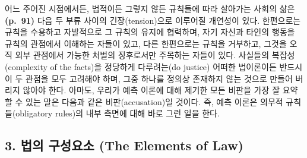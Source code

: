어느 주어진 시점에서든, 법적이든 그렇지 않든 규칙들에 따라 살아가는
사회의 삶은 \textbf{(p.~91)} 다음 두 부류 사이의 긴장(tension)으로
이루어질 개연성이 있다. 한편으로는 규칙을 수용하고 자발적으로 그 규칙의
유지에 협력하며, 자기 자신과 타인의 행동을 규칙의 관점에서 이해하는
자들이 있고, 다른 한편으로는 규칙을 거부하고, 그것을 오직 외부 관점에서
가능한 처벌의 징후로서만 주목하는 자들이 있다. 사실들의
복잡성(complexity of the facts)을 정당하게 다루려는(do justice) 어떠한
법이론이든 반드시 이 두 관점을 모두 고려해야 하며, 그중 하나를 정의상
존재하지 않는 것으로 만들어 버리지 않아야 한다. 아마도, 우리가 예측
이론에 대해 제기한 모든 비판을 가장 잘 요약할 수 있는 말은 다음과 같은
비판(accusation)일 것이다. 즉, 예측 이론은 의무적 규칙들(obligatory
rules)의 내부 측면에 대해 바로 그런 일을 한다.

\subsection{3. 법의 구성요소 (The Elements of
Law)}\label{uxbc95uxc758-uxad6cuxc131uxc694uxc18c-the-elements-of-law}

